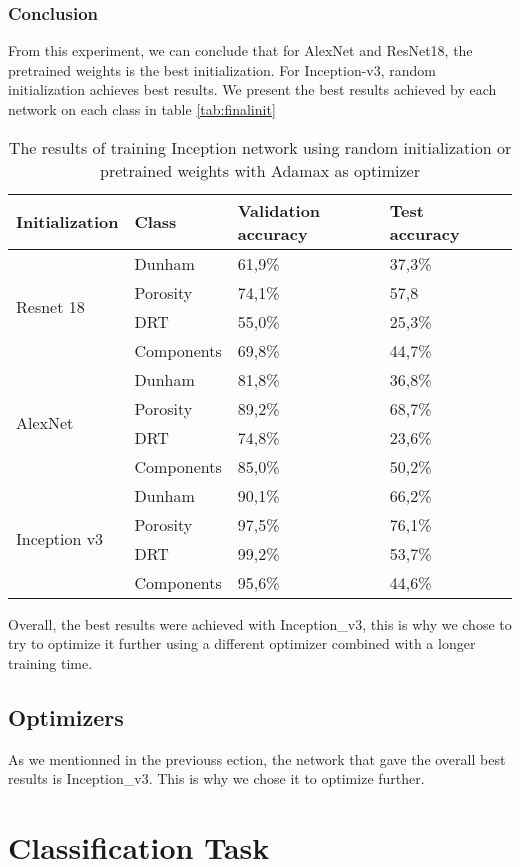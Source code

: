 \subsubsection{Conclusion}
From this experiment, we can conclude that for AlexNet and ResNet18, the pretrained weights is the best initialization. For Inception-v3, random initialization achieves best results. We present the best results achieved by each network on each class in table \ref{tab:finalinit}
\begin{table}
\caption{\label{tab:googinit} The results of training Inception network using random initialization or pretrained weights with Adamax as optimizer}
\centering
\begin{tabular}[b]{| l | l | l | l | l |}
\hline
    Initialization & Class & Validation accuracy  & Test accuracy\\ \hline
    \multirow{4}{*}{Resnet 18} & Dunham &  61,9\%  & 37,3\% \\ %
    & Porosity & 74,1\% &  57,8& \\
    &DRT & 55,0\% &  25,3\% \\
    &Components & 69,8\% &  44,7\% \\ \hline
     \multirow{4}{*}{AlexNet} & Dunham &  81,8\% & 36,8\% \\
    & Porosity & 89,2\% &  68,7\% \\
    &DRT & 74,8\% &   23,6\% \\
    &Components & 85,0\% & 50,2\% \\ \hline
    \multirow{4}{*}{Inception v3} & Dunham &  90,1\% & 66,2\% \\
    & Porosity & 97,5\% &  76,1\% \\
    &DRT & 99,2\% &  53,7\% \\
    &Components & 95,6\% & 44,6\% \\ \hline
\end{tabular} 
\end{table}
Overall, the best results were achieved with Inception\_v3, this is why we chose to try to optimize it further using a different optimizer combined with a longer training time. 

\subsection{Optimizers}
As we mentionned in the previouss ection, the network that gave the overall best results is Inception\_v3.
This is why we chose it to optimize further. 
\section{Classification Task}

